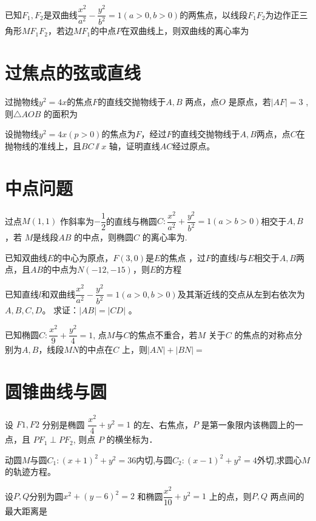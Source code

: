 \documentclass{article}
\begin{document}
    \question 已知$F_1,F_2$是双曲线$\dfrac{x^2}{a^2}-\dfrac{y^2}{b^2}=1(a>0,b>0)$的两焦点，以线段$F_1F_2$为边作正三角形$MF_1F_2$，若边$MF_1$的中点$P$在双曲线上，则双曲线的离心率为\lines

\section{过焦点的弦或直线}
    \question 过抛物线$y^2=4x$的焦点$F$的直线交抛物线于$A,B$ 两点，点$O$ 是原点，若$|AF|=3$ , 则$\triangle AOB$ 的面积为\lines

     \question 设抛物线$y^2=4x(p>0)$的焦点为$F$，经过$F$的直线交抛物线于$A,B$两点，点$C$在抛物线的准线上，且$BC\varparallel x$ 轴，证明直线$AC$经过原点。
\section{中点问题}
    \question[2014江西 ]过点$M(1,1)$ 作斜率为$-\dfrac12$的直线与椭圆$C: \dfrac{x^2}{a^2}+\dfrac{y^2}{b^2}=1(a>b>0)$相交于$A,B$ ，若 $M$是线段$AB$ 的中点，则椭圆$C$ 的离心率为\lines.

    \question 已知双曲线$E$的中心为原点，$F(3,0)$是$E$的焦点 ，过$F$的直线$l$与$E$相交于$A,B$两点，且$AB$的中点为$N(-12,-15)$，则$E$的方程\lines

    \question 已知直线$l$和双曲线$\dfrac{x^2}{a^2}-\dfrac{y^2}{b^2}=1(a>0,b>0)$及其渐近线的交点从左到右依次为$A,B,C,D$。 求证：$|AB|=|CD|$ 。

    \question[2014辽宁 ]已知椭圆$C: \dfrac{x^2}{9}+\dfrac{y^2}{4}=1$, 点$M$与$C$的焦点不重合，若$M$ 关于$C$ 的焦点的对称点分别为$A,B$，线段$MN $的中点在$C$ 上，则$|AN|+|BN|=$\lines



\section{圆锥曲线与圆}
    \question 设 $F1, F2$ 分别是椭圆 $\dfrac{x^2}{4}+y^2=1$ 的左、右焦点，$P$ 是第一象限内该椭圆上的一点，且 $PF_1\perp PF_2$, 则点 $P$ 的横坐标为\lines．%

    \question[*]动圆$M$与圆$C_1:(x+1)^2+y^2=36$内切,与圆$C_2:(x-1)^2+y^2=4$外切,求圆心$M$ 的轨迹方程。%

    \question[2014福建 ]设$P,Q$分别为圆$x^2+(y-6)^2=2$ 和椭圆$\dfrac{x^2}{10}+y^2=1$ 上的点，则$P,Q$ 两点间的最大距离是

\end{document}
